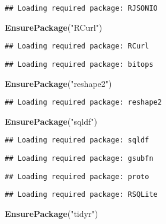 \documentclass[]{article}
\newenvironment{Shaded}{\begin{snugshade}}{\end{snugshade}}
\newcommand{\KeywordTok}[1]{\textcolor[rgb]{0.13,0.29,0.53}{\textbf{#1}}}
\newcommand{\StringTok}[1]{\textcolor[rgb]{0.31,0.60,0.02}{#1}}
\newcommand{\NormalTok}[1]{#1}
\begin{document}
\begin{verbatim}
## Loading required package: RJSONIO
\end{verbatim}

\begin{Shaded}
\begin{Highlighting}[]
\KeywordTok{EnsurePackage}\NormalTok{(}\StringTok{"RCurl"}\NormalTok{)}
\end{Highlighting}
\end{Shaded}

\begin{verbatim}
## Loading required package: RCurl
\end{verbatim}

\begin{verbatim}
## Loading required package: bitops
\end{verbatim}

\begin{Shaded}
\begin{Highlighting}[]
\KeywordTok{EnsurePackage}\NormalTok{(}\StringTok{"reshape2"}\NormalTok{)}
\end{Highlighting}
\end{Shaded}

\begin{verbatim}
## Loading required package: reshape2
\end{verbatim}

\begin{Shaded}
\begin{Highlighting}[]
\KeywordTok{EnsurePackage}\NormalTok{(}\StringTok{"sqldf"}\NormalTok{)}
\end{Highlighting}
\end{Shaded}

\begin{verbatim}
## Loading required package: sqldf
\end{verbatim}

\begin{verbatim}
## Loading required package: gsubfn
\end{verbatim}

\begin{verbatim}
## Loading required package: proto
\end{verbatim}

\begin{verbatim}
## Loading required package: RSQLite
\end{verbatim}

\begin{Shaded}
\begin{Highlighting}[]
\KeywordTok{EnsurePackage}\NormalTok{(}\StringTok{"tidyr"}\NormalTok{)}
\end{Highlighting}
\end{Shaded}
\end{document}
